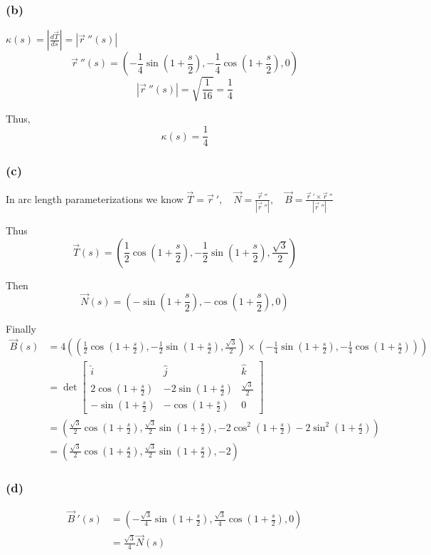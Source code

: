 \documentclass{article}
\begin{document}
\subsubsection*{(b)}
\(\kappa(s) = |\frac{d\vec{T}}{ds}| = |\vec{r}\ ''(s)|\)
\[
\vec{r}\ ''(s) = \left(-\frac{1}{4}\sin\left(1+ \frac{s}{2}\right), -\frac{1}{4}\cos\left(1+ \frac{s}{2}\right),0 \right)
\]
\[
|\vec{r}\ ''(s)| = \sqrt{\frac{1}{16}} = \frac{1}{4}
\]

Thus,
\[
\kappa(s) = \frac{1}{4}
\]


\subsubsection*{(c)}
In arc length parameterizations we know \(\vec{T} = \vec{r}\ ', \quad \vec{N} = \frac{\vec{r}\ ''}{|\vec{r}\ ''|}, \quad \vec{B} = \frac{\vec{r}\ ' \times \vec{r}\ ''}{|\vec{r}\ ''|}\)

Thus
\[
\vec{T}(s) = \left(\frac{1}{2}\cos\left(1+ \frac{s}{2}\right), -\frac{1}{2}\sin\left(1+ \frac{s}{2}\right), \frac{\sqrt{3}}{2}\right)
\]

Then
\[
\vec{N}(s) = (-\sin\left(1+ \frac{s}{2}\right), -\cos\left(1+ \frac{s}{2}\right),0)
\]

Finally
\begin{align*}
    \vec{B}(s) &= 4\left(\left(\frac{1}{2}\cos\left(1+ \frac{s}{2}\right), -\frac{1}{2}\sin\left(1+ \frac{s}{2}\right), \frac{\sqrt{3}}{2}\right) \times \left(-\frac{1}{4}\sin\left(1+ \frac{s}{2}\right), -\frac{1}{4}\cos\left(1+ \frac{s}{2}\right) \right)\right) 
    \\    
    &= \det\begin{bmatrix}
        \hat{i} & \hat{j} & \hat{k} \\
        2\cos\left(1+ \frac{s}{2}\right) & -2\sin\left(1+ \frac{s}{2}\right) & \frac{\sqrt{3}}{2} \\
        -\sin\left(1+ \frac{s}{2}\right) & -\cos\left(1+ \frac{s}{2}\right) & 0
    \end{bmatrix}
    \\
    &= \left(\frac{\sqrt{3}}{2}\cos\left(1+ \frac{s}{2}\right), \frac{\sqrt{3}}{2}\sin\left(1+ \frac{s}{2}\right), -2\cos^2\left(1+\frac{s}{2}\right)-2\sin^2\left(1+\frac{s}{2}\right)\right)
    \\
    &= \left(\frac{\sqrt{3}}{2}\cos\left(1+ \frac{s}{2}\right), \frac{\sqrt{3}}{2}\sin\left(1+ \frac{s}{2}\right), -2\right)
\end{align*}

\subsubsection*{(d)}
\begin{align*}
    \vec{B}\ '(s) &= \left(-\frac{\sqrt{3}}{4}\sin\left(1+ \frac{s}{2}\right), \frac{\sqrt{3}}{4}\cos\left(1+ \frac{s}{2}\right), 0\right) \\
    &= \frac{\sqrt{3}}{4}\vec{N}(s)
\end{align*}
\end{document}
